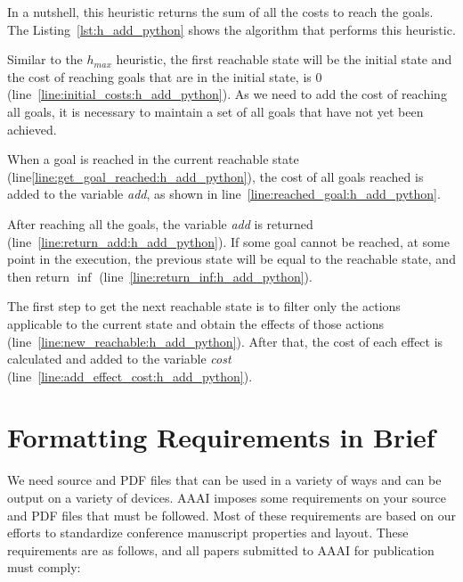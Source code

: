 \documentclass[letterpaper]{article}
\begin{document}
In a nutshell, this heuristic returns the sum of all the costs to reach the goals. The Listing~\ref{lst:h_add_python} shows the algorithm that performs this heuristic.



Similar to the $h_{max}$ heuristic, the first reachable state will be the initial state and the cost of reaching goals that are in the initial state, is $0$ (line~\ref{line:initial_costs:h_add_python}). As we need to add the cost of reaching all goals, it is necessary to maintain a set of all goals that have not yet been achieved.

When a goal is reached in the current reachable state (line\ref{line:get_goal_reached:h_add_python}), the cost of all goals reached is added to the variable \textit{add}, as shown in line~\ref{line:reached_goal:h_add_python}.

After reaching all the goals, the variable \textit{add} is returned (line~\ref{line:return_add:h_add_python}). If some goal cannot be reached, at some point in the execution, the previous state will be equal to the reachable state, and then return $\inf$ (line~\ref{line:return_inf:h_add_python}).

The first step to get the next reachable state is to filter only the actions applicable to the current state and obtain the effects of those actions (line~\ref{line:new_reachable:h_add_python}). After that, the cost of each effect is calculated and added to the variable \textit{cost} (line~\ref{line:add_effect_cost:h_add_python}).

\section{Formatting Requirements in Brief}
We need source and PDF files that can be used in a variety of ways and can be output on a variety of devices. AAAI imposes some requirements on your source and PDF files that must be followed. Most of these requirements are based on our efforts to standardize conference manuscript properties and layout. These requirements are as follows, and all papers submitted to AAAI for publication must comply:
\end{document}
